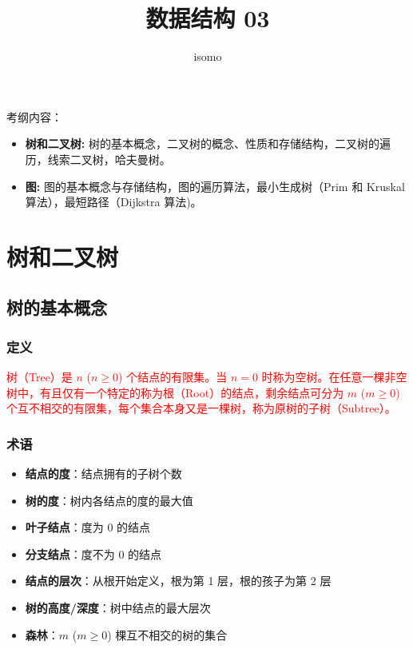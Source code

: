 \documentclass{../../note}
\title{数据结构 03}
\author{isomo}
\begin{document}
\maketitle

考纲内容：

\begin{itemize}

  \item \textbf{树和二叉树: }
    树的基本概念，二叉树的概念、性质和存储结构，二叉树的遍历，线索二叉树，哈夫曼树。

  \item \textbf{图: }
  图的基本概念与存储结构，图的遍历算法，最小生成树（Prim 和 Kruskal 算法），最短路径（Dijkstra 算法)。
\end{itemize}

\section{树和二叉树}

\subsection{树的基本概念}

\subsubsection{定义}
\textcolor{red}{树（Tree）是 $n$ ($n \geq 0$) 个结点的有限集。当 $n=0$ 时称为空树。在任意一棵非空树中，有且仅有一个特定的称为根（Root）的结点，剩余结点可分为 $m$ ($m \geq 0$) 个互不相交的有限集，每个集合本身又是一棵树，称为原树的子树（Subtree）。}

\subsubsection{术语}
\begin{itemize}
\item \textbf{结点的度}：结点拥有的子树个数
\item \textbf{树的度}：树内各结点的度的最大值
\item \textbf{叶子结点}：度为 0 的结点
\item \textbf{分支结点}：度不为 0 的结点
\item \textbf{结点的层次}：从根开始定义，根为第 1 层，根的孩子为第 2 层
\item \textbf{树的高度/深度}：树中结点的最大层次
\item \textbf{森林}：$m$ ($m \geq 0$) 棵互不相交的树的集合
\end{itemize}
\end{document}
